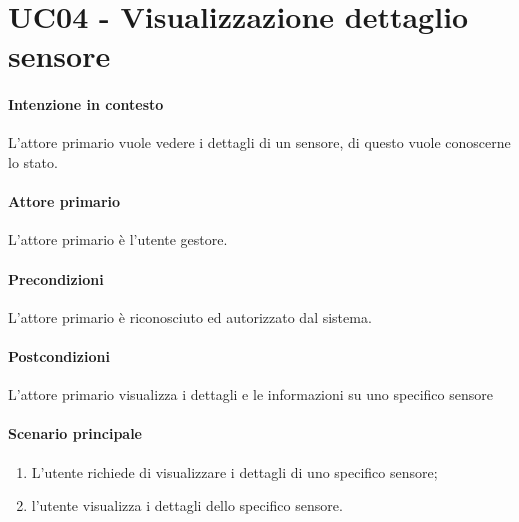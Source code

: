 \section{UC04 - Visualizzazione dettaglio sensore}\label{uc:04}
\paragraph{Intenzione in contesto} L'attore primario vuole vedere i dettagli di un sensore, di questo vuole conoscerne lo stato.
\paragraph{Attore primario} L'attore primario è l'utente gestore.
\paragraph{Precondizioni}L'attore primario è riconosciuto ed autorizzato dal sistema.
\paragraph{Postcondizioni} L'attore primario visualizza i dettagli e le informazioni su uno specifico sensore
\paragraph{Scenario principale}
\begin{enumerate}
    \item L'utente richiede di visualizzare i dettagli di uno specifico sensore;
    \item l'utente visualizza i dettagli dello specifico sensore.
\end{enumerate}